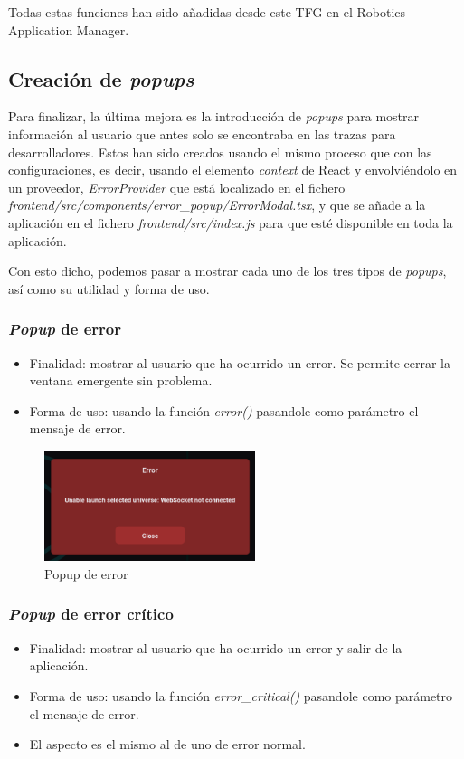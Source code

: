 Todas estas funciones han sido añadidas desde este TFG en el Robotics Application Manager.

\subsection{Creación de \textit{popups}}

Para finalizar, la última mejora es la introducción de \textit{popups} para mostrar información al usuario que antes solo se encontraba en las trazas para desarrolladores. Estos han sido creados usando el mismo proceso que con las configuraciones, es decir, usando el elemento \textit{context} de React y envolviéndolo en un proveedor, \textit{ErrorProvider} que está localizado en el fichero \textit{frontend/src/components/error\_popup/ErrorModal.tsx}, y que se añade a la aplicación en el fichero \textit{frontend/src/index.js} para que esté disponible en toda la aplicación.

Con esto dicho, podemos pasar a mostrar cada uno de los tres tipos de \textit{popups}, así como su utilidad y forma de uso.

\subsubsection{\textit{Popup} de error}
\begin{itemize}
    \item Finalidad: mostrar al usuario que ha ocurrido un error. Se permite cerrar la ventana emergente sin problema.
    \item Forma de uso: usando la función \textit{error()} pasandole como parámetro el mensaje de error.
\end{itemize}
\begin{figure}[H]
    \centering
    \includegraphics[width=0.55\textwidth]{figures/bt-avances/error.png}
    \caption{Popup de error}
    \label{fig:bt-err}
\end{figure}

\subsubsection{\textit{Popup} de error crítico}
\begin{itemize}
    \item Finalidad: mostrar al usuario que ha ocurrido un error y salir de la aplicación.
    \item Forma de uso: usando la función \textit{error\_critical()} pasandole como parámetro el mensaje de error.
    \item El aspecto es el mismo al de uno de error normal.
\end{itemize}

